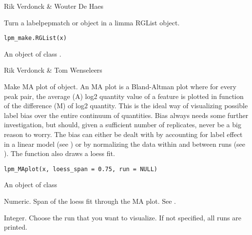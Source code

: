 \documentclass[letterpaper]{book}
\begin{document}
%
\begin{Author}\relax
Rik Verdonck \& Wouter De Haes
\end{Author}
%
\begin{Description}\relax
Turn a labelpepmatch  or  object in a limma RGList object.
\end{Description}
%
\begin{Usage}
\begin{verbatim}
lpm_make.RGList(x)
\end{verbatim}
\end{Usage}
%
\begin{Arguments}
\begin{ldescription}
\item[\code{x}] An object of class .
\end{ldescription}
\end{Arguments}
%
\begin{Author}\relax
Rik Verdonck \& Tom Wenseleers
\end{Author}
%
\begin{Description}\relax
Make MA plot of  object. An MA plot is a Bland-Altman plot where for every peak pair, the average (A) log2 quantity value of a feature is plotted in function of the difference (M) of log2 quantity. This is the ideal way of visualizing possible label bias over the entire continuum of quantities. Bias always needs some further investigation, but should, given a sufficient number of replicates, never be a big reason to worry. The bias can either be dealt with by accounting for label effect in a linear model (see ) or by normalizing the data within and between runs (see ). The function also draws a loess fit.
\end{Description}
%
\begin{Usage}
\begin{verbatim}
lpm_MAplot(x, loess_span = 0.75, run = NULL)
\end{verbatim}
\end{Usage}
%
\begin{Arguments}
\begin{ldescription}
\item[\code{x}] An object of class 

\item[\code{loess\_span}] Numeric. Span of the loess fit through the MA plot. See .

\item[\code{run}] Integer. Choose the run that you want to visualize. If not specified, all runs are printed.
\end{ldescription}
\end{Arguments}
\end{document}

